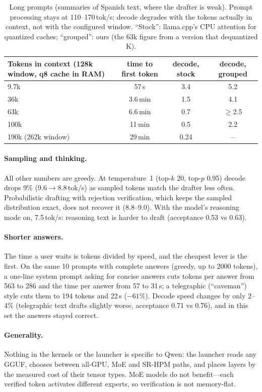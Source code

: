 \documentclass[10pt]{article}
\newcommand{\tps}{tok/s}
\begin{document}
\begin{table}[t]
\centering\small
\begin{tabular}{lccc}
\toprule
Tokens in context (128k window, q8 cache in RAM) & time to first token & decode, stock & decode, grouped \\
\midrule
9.7k & 57\,s & 3.4 & 5.2 \\
36k & 3.6\,min & 1.5 & 4.1 \\
63k & 6.6\,min & 0.7 & $\ge$2.5 \\
100k & 11\,min & 0.5 & 2.2 \\
190k (262k window) & 29\,min & 0.24 & -- \\
\bottomrule
\end{tabular}
\caption{Long prompts (summaries of Spanish text, where the drafter is weak). Prompt processing stays at
110--170\,\tps; decode degrades with the tokens actually in context, not with the configured window. ``Stock'':
llama.cpp's CPU attention for quantized caches; ``grouped'': ours (the 63k figure from a version that dequantized K).}
\label{tab:ctx}
\end{table}

\paragraph{Sampling and thinking.} All other numbers are greedy. At temperature~1 (top-$k$ 20, top-$p$ 0.95) decode
drops 9\% (9.6$\to$8.8\,\tps) as sampled tokens match the drafter less often. Probabilistic drafting with rejection
verification, which keeps the sampled distribution exact, does not recover it (8.8--9.0). With the model's reasoning
mode on, 7.5\,\tps: reasoning text is harder to draft (acceptance 0.53 vs 0.63).

\paragraph{Shorter answers.} The time a user waits is tokens divided by speed, and the cheapest lever is the first.
On the same 10 prompts with complete answers (greedy, up to 2000 tokens), a one-line system prompt asking for concise
answers cuts tokens per answer from 563 to 286 and the time per answer from 57 to 31\,s; a telegraphic
(``caveman'') style cuts them to 194 tokens and 22\,s ($-61\%$). Decode speed changes by only 2--4\% (telegraphic
text drafts slightly worse, acceptance 0.71 vs 0.76), and in this set the answers stayed correct.

\paragraph{Generality.} Nothing in the kernels or the launcher is specific to Qwen: the launcher reads any GGUF,
chooses between all-GPU, MoE and SR-HPM paths, and places layers by the measured cost of their tensor types. MoE models
do not benefit---each verified token activates different experts, so verification is not memory-flat.
\end{document}
